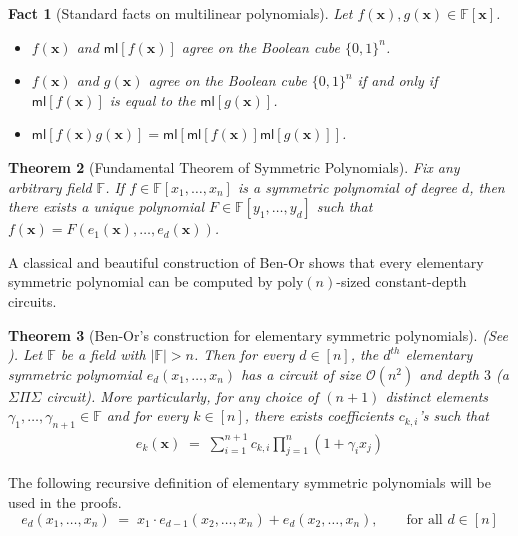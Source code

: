 \documentclass[11pt]{article}
\newtheorem{theorem}{Theorem}[section]
\newtheorem{fact}[theorem]{Fact}
\newcommand{\Boo}{\{0,1 \}}
\newcommand{\bigO}{\mathcal{O}}
\newcommand{\F}{\mathbb{F}}
\newcommand{\ml}{\mathsf{ml}}
\begin{document}
\begin{fact}[Standard facts on multilinear polynomials]\label{fact:multilinear}
Let $f(\mathbf{x}), g(\mathbf{x}) \in \F[\mathbf{x}]$.
\begin{itemize}
    \item $f(\mathbf{x})$ and $\ml[f(\mathbf{x})]$ agree on the Boolean cube $\Boo^{n}$.
    \item $f(\mathbf{x})$ and $g(\mathbf{x})$ agree on the Boolean cube $\Boo^{n}$ if and only if $\ml[f(\mathbf{x})]$ is equal to the $\ml[g(\mathbf{x})]$.
    \item $\ml[f(\mathbf{x}) g(\mathbf{x})] = \ml[\ml[f(\mathbf{x})] \ml[g(\mathbf{x})]]$.
\end{itemize}
\end{fact}
\noindent



\begin{theorem}[Fundamental Theorem of Symmetric Polynomials]\label{thm:fundamental-sym}
Fix any arbitrary field $\F$. If $f \in \F[x_{1},\ldots,x_{n}]$ is a symmetric polynomial of degree $d$, then there exists a unique polynomial $F \in \F[y_{1},\ldots,y_{d}]$ such that $f(\mathbf{x}) = F(e_{1}(\mathbf{x}),\ldots,e_{d}(\mathbf{x}))$.
\end{theorem}

\noindent
A classical and beautiful construction of Ben-Or shows that every elementary symmetric polynomial can be computed by $\mathrm{poly}(n)$-sized constant-depth circuits.\\


\begin{theorem}[Ben-Or's construction for elementary symmetric polynomials]\label{thm:ben-or}
(See \cite[Theorem 5.1]{Shpilka-Wigderson}). Let $\F$ be a field with $|\F| > n$. Then for every $d \in [n]$, the $d^{th}$ elementary symmetric polynomial $e_{d}(x_{1},\ldots,x_{n})$ has a circuit of size $\bigO(n^{2})$ and depth $3$ (a $\Sigma \Pi \Sigma$ circuit).\newline
More particularly, for any choice of $(n+1)$ distinct elements $\gamma_{1},\ldots,\gamma_{n+1} \in \F$ and for every $k \in [n]$, there exists coefficients $c_{k,i}$'s such that
\begin{align*}
    e_{k}(\mathbf{x}) \; = \; \sum_{i=1}^{n+1} c_{k,i} \prod_{j=1}^{n} (1+\gamma_{i} x_{j})
\end{align*}
\end{theorem}
The following recursive definition of elementary symmetric polynomials will be used in the proofs.
\begin{equation}\label{eqn:recursive-elem-sym}
    e_{d}(x_{1},\ldots,x_{n}) \; = \; x_{1} \cdot e_{d-1}(x_{2},\ldots,x_{n}) + e_{d}(x_{2},\ldots,x_{n}), \quad \quad \text{for all } d \in [n]
\end{equation}
\end{document}
